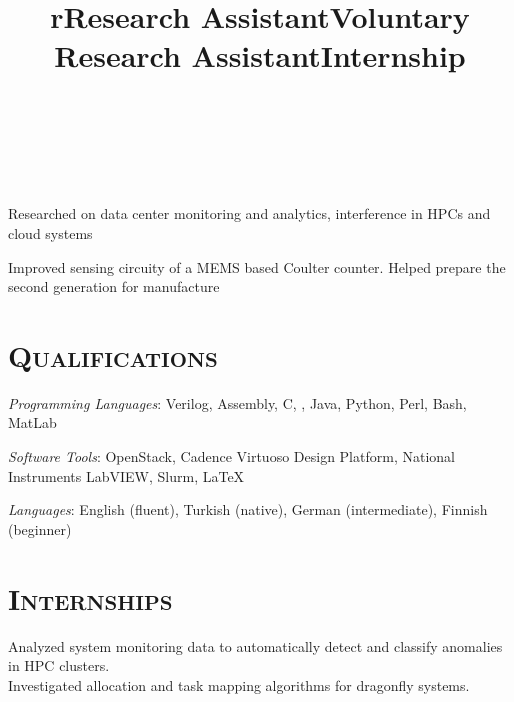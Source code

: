 \begin{resume}
	\begin{formatb}
		\title{r}\\
		\\
		\body\\
	\end{formatb}
	
	\title{Research Assistant}
	\begin{position}
		Researched on data center monitoring and analytics, interference in HPCs and
    cloud systems 
	\end{position}
	
	\title{Voluntary Research Assistant}
	\begin{position}
		Improved sensing circuity of a MEMS based Coulter counter. Helped prepare
    the second generation for manufacture 
	\end{position}
	
	\section{\textsc{Qualifications}}
	
	\emph{Programming Languages}: Verilog, Assembly, C, \Cplusplus, Java, Python,
	Perl, Bash, MatLab
	\setlength{\parskip}{1mm}
	
	\emph{Software Tools}: OpenStack, Cadence Virtuoso Design Platform, National
	Instruments LabVIEW, Slurm, \LaTeX
	
	
	
	\emph{Languages}: English (fluent), Turkish (native), German (intermediate),
  Finnish (beginner) 
	
	\section{\textsc{Internships}}
	
	\title{Internship}
	\begin{position}
		Analyzed system monitoring data to automatically detect and classify
    anomalies in HPC clusters. \\
    Investigated allocation and task mapping algorithms for dragonfly systems.
	\end{position}
	

\end{resume}
